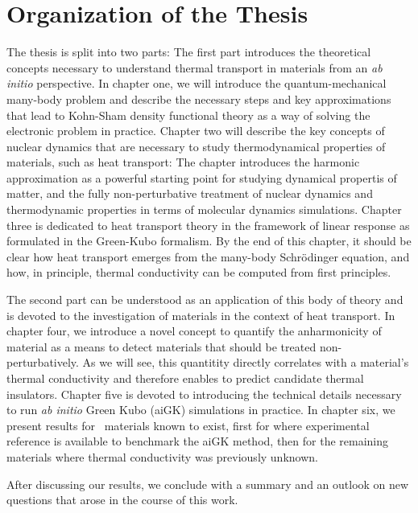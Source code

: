 \section*{Organization of the Thesis}
The thesis is split into two parts: The first part introduces the theoretical concepts necessary to understand thermal transport in materials from an \emph{ab initio} perspective.
In chapter one, we will introduce the quantum-mechanical many-body problem and describe the necessary steps and key approximations that lead to Kohn-Sham density functional theory as a way of solving the electronic problem in practice. Chapter two will describe the key concepts of nuclear dynamics that are necessary to study thermodynamical properties of materials, such as heat transport: The chapter introduces the harmonic approximation as a powerful starting point for studying dynamical propertis of matter, and the fully non-perturbative treatment of nuclear dynamics and thermodynamic properties in terms of molecular dynamics simulations. Chapter three is dedicated to heat transport theory in the framework of linear response as formulated in the Green-Kubo formalism. By the end of this chapter, it should be clear how heat transport emerges from the many-body Schr\"odinger equation, and how, in principle, thermal conductivity can be computed from first principles.

The second part can be understood as an application of this body of theory and is devoted to the investigation of materials in the context of heat transport. In chapter four, we introduce a novel concept to quantify the anharmonicity of material as a means to detect materials that should be treated non-perturbatively. As we will see, this quantitity directly correlates with a material's thermal conductivity and therefore enables to predict candidate thermal insulators. Chapter five is devoted to introducing the technical details necessary to run \emph{ab initio} Green Kubo (aiGK) simulations in practice. In chapter six, we present results for ~materials known to exist, first for  where experimental reference is available to benchmark the aiGK method, then for the remaining materials where thermal conductivity was previously unknown.

After discussing our results, we conclude with a summary and an outlook on new questions that arose in the course of this work.
